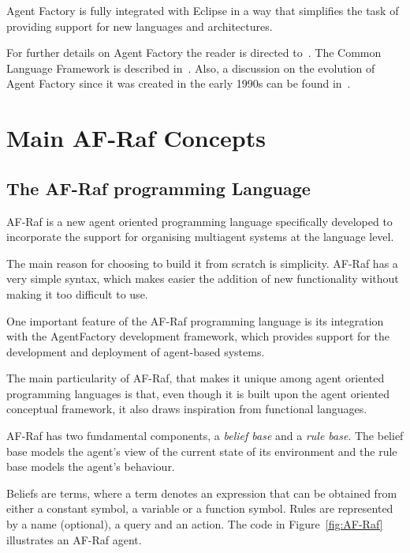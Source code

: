 \documentclass[a4paper,12pt,oneside,fleqn]{book} %
\theoremstyle{plain}
\theoremstyle{definition}
\theoremstyle{remark}
\begin{document}
Agent Factory is fully integrated with Eclipse in a way that simplifies
the task of providing support for new languages and architectures.

For further details on Agent Factory the reader is directed
to~\cite{collier2009modeling}. The Common Language Framework is described
in~\cite{russell2011af}. Also, a discussion on the evolution of Agent Factory since it
was created in the early 1990s can be found in~\cite{muldoon2009towards}.



\chapter{Main AF-Raf Concepts} %

\section{The AF-Raf programming Language} %

AF-Raf is a new agent oriented programming language specifically
developed to incorporate the support for organising multiagent
systems at the language level.

The main reason for choosing to build it from scratch is simplicity.  AF-Raf
has a very simple syntax, which makes easier the addition of new functionality
without making it too difficult to use.

One important feature of the AF-Raf programming language is its integration
with the AgentFactory development framework, which provides support for the
development and deployment of agent-based systems.

The main particularity of AF-Raf, that makes it unique among agent oriented
programming languages is that, even though it is built upon the agent
oriented conceptual framework, it also draws inspiration from functional
languages.

AF-Raf has two fundamental components, a \textit{belief base}
and a \textit{rule base}. The belief base models the agent's view of the
current state of its environment and the rule base models the agent's
behaviour.

Beliefs are terms, where a term denotes an expression that can be obtained from
either a constant symbol, a variable or a function symbol. Rules are
represented by a name (optional), a query and an action.  The code in
Figure~\ref{fig:AF-Raf} illustrates an AF-Raf agent.
\end{document}
